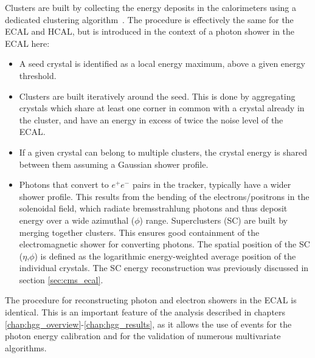 Clusters are built by collecting the energy deposits in the calorimeters using a dedicated clustering algorithm~\cite{Khachatryan:2015hwa}. The procedure is effectively the same for the ECAL and HCAL, but is introduced in the context of a photon shower in the ECAL here:
\begin{itemize}
    \item A seed crystal is identified as a local energy maximum, above a given energy threshold.
    \item Clusters are built iteratively around the seed. This is done by aggregating crystals which share at least one corner in common with a crystal already in the cluster, and have an energy in excess of twice the noise level of the ECAL.
    \item If a given crystal can belong to multiple clusters, the crystal energy is shared between them assuming a Gaussian shower profile.
    \item Photons that convert to $e^+e^-$ pairs in the tracker, typically have a wider shower profile. This results from the bending of the electrons/positrons in the solenoidal field, which radiate bremsstrahlung photons and thus deposit energy over a wide azimuthal ($\phi$) range. Superclusters (SC) are built by merging together clusters. This ensures good containment of the electromagnetic shower for converting photons. The spatial position of the SC ($\eta$,$\phi$) is defined as the logarithmic energy-weighted average position of the individual crystals. The SC energy reconstruction was previously discussed in section \ref{sec:cms_ecal}.
\end{itemize}
\noindent
The procedure for reconstructing photon and electron showers in the ECAL is identical. This is an important feature of the \Hgg analysis described in chapters \ref{chap:hgg_overview}-\ref{chap:hgg_results}, as it allows the use of \Zee events for the photon energy calibration and for the validation of numerous multivariate algorithms.

